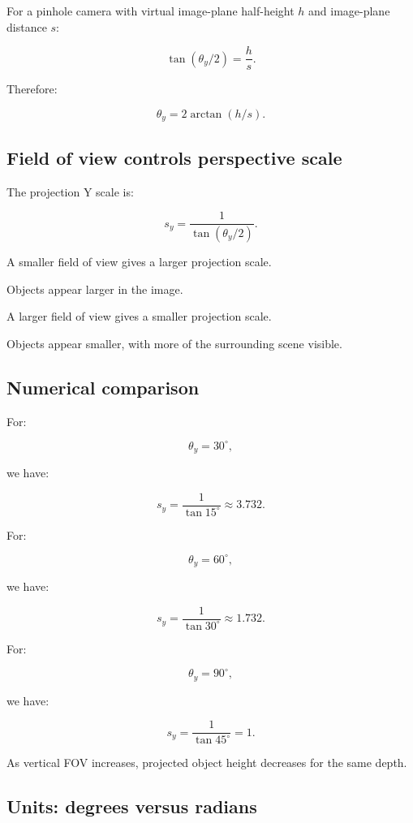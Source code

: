 For a pinhole camera with virtual image-plane half-height \(h\) and image-plane distance \(s\):

\[
 \boxed{ \tan(\theta_y/2)=\frac hs }.
\]

Therefore:

\[
 \boxed{ \theta_y=2\arctan(h/s) }.
\]

\subsection{Field of view controls perspective scale}\label{02-foundations-ii-ch033-field-of-view-controls-perspective-scale}

\hypertarget{02-foundations-ii-ch033-field-of-view-controls-perspective-scale}{}

The projection Y scale is:

\[
 \boxed{ s_y=\frac1{\tan(\theta_y/2)} }.
\]

A smaller field of view gives a larger projection scale.

Objects appear larger in the image.

A larger field of view gives a smaller projection scale.

Objects appear smaller, with more of the surrounding scene visible.

\subsection{Numerical comparison}\label{02-foundations-ii-ch033-numerical-comparison}

\hypertarget{02-foundations-ii-ch033-numerical-comparison}{}

For:

\[
 \theta_y=30^\circ,
\]

we have:

\[
 s_y=\frac1{\tan15^\circ}\approx3.732.
\]

For:

\[
 \theta_y=60^\circ,
\]

we have:

\[
 s_y=\frac1{\tan30^\circ}\approx1.732.
\]

For:

\[
 \theta_y=90^\circ,
\]

we have:

\[
 s_y=\frac1{\tan45^\circ}=1.
\]

As vertical FOV increases, projected object height decreases for the same depth.

\subsection{Units: degrees versus radians}\label{02-foundations-ii-ch033-units-degrees-versus-radians}

